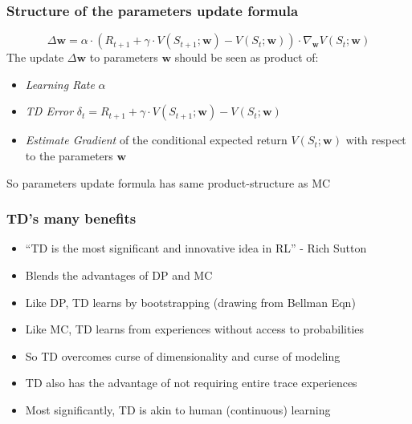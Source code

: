 \documentclass[handout]{beamer}
\begin{document}
\begin{frame}
\frametitle{Structure of the parameters update formula}
\pause
$$\Delta \bm{w} = \alpha \cdot (R_{t+1} + \gamma \cdot V(S_{t+1};\bm{w}) - V(S_t;\bm{w})) \cdot \nabla_{\bm{w}} V(S_t;\bm{w})$$
\vspace{3mm}
\pause
The update $\Delta \bm{w}$ to parameters $\bm{w}$ should be seen as product of:
\pause
\begin{itemize}[<+->]
\item {\em Learning Rate} $\alpha$
\item {\em TD Error} $\delta_t = R_{t+1} + \gamma \cdot V(S_{t+1}; \bm{w}) - V(S_t; \bm{w})$
\item {\em Estimate Gradient} of the conditional expected return $V(S_t;\bm{w})$ with respect to the parameters $\bm{w}$
\end{itemize}
\pause
\vspace{3mm}
So parameters update formula has same product-structure as MC
\end{frame}


\begin{frame}
\frametitle{TD's many benefits}
\pause
\begin{itemize}[<+->]
\item ``TD is the most significant and innovative idea in RL'' - Rich Sutton
\item Blends the advantages of DP and MC
\item Like DP, TD learns by bootstrapping (drawing from Bellman Eqn)
\item Like MC, TD learns from experiences without access to probabilities
\item So TD overcomes curse of dimensionality and curse of modeling
\item TD also has the advantage of not requiring entire trace experiences
\item Most significantly, TD is akin to human (continuous) learning
\end{itemize}
\end{frame}
\end{document}
